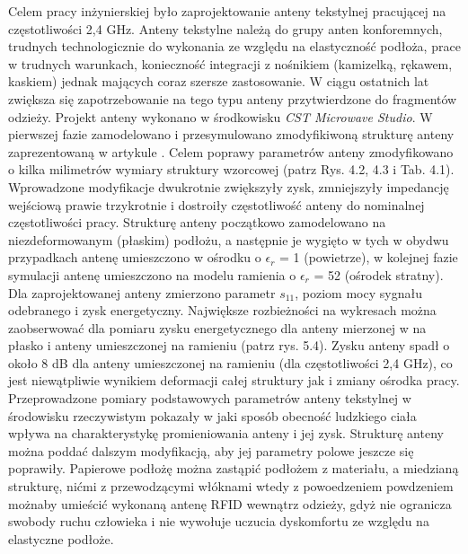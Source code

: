 Celem pracy inżynierskiej było zaprojektowanie anteny tekstylnej pracującej na częstotliwości 2,4 GHz. Anteny tekstylne należą do grupy anten konforemnych, trudnych technologicznie do wykonania ze względu na elastyczność podłoża, prace w trudnych warunkach, konieczność integracji z nośnikiem (kamizelką, rękawem, kaskiem) jednak mających coraz szersze zastosowanie. W ciągu ostatnich lat zwiększa się zapotrzebowanie na tego typu anteny przytwierdzone do fragmentów odzieży.
Projekt anteny wykonano w środkowisku \emph{CST Microwave Studio}. W pierwszej fazie zamodelowano i przesymulowano zmodyfikiwoną strukturę anteny zaprezentowaną w artykule \cite{Artykul_1}. Celem poprawy parametrów anteny zmodyfikowano o kilka milimetrów wymiary struktury wzorcowej (patrz Rys. 4.2, 4.3 i Tab. 4.1). Wprowadzone modyfikacje dwukrotnie zwiększyły zysk, zmniejszyły impedancję wejściową prawie trzykrotnie i dostroiły częstotliwość anteny do nominalnej częstotliwości pracy.
Strukturę anteny początkowo zamodelowano na niezdeformowanym (płaskim) podłożu, a następnie je wygięto w tych w obydwu przypadkach antenę umieszczono w ośrodku o $\epsilon_{r}$ = 1 (powietrze), w kolejnej fazie symulacji antenę umieszczono na modelu ramienia o $\epsilon_{r}$ = 52 (ośrodek stratny).    
Dla zaprojektowanej anteny zmierzono parametr $s_{11}$, poziom mocy sygnału odebranego i zysk energetyczny. Największe rozbieżności na wykresach można zaobserwować dla pomiaru zysku energetycznego dla anteny mierzonej w na płasko i anteny umieszczonej na ramieniu (patrz rys. 5.4). Zysku anteny spadł o około 8 dB dla anteny umieszczonej na ramieniu (dla częstotliwości 2,4 GHz), co jest niewątpliwie wynikiem deformacji całej struktury jak i zmiany ośrodka pracy. 
Przeprowadzone pomiary podstawowych parametrów anteny tekstylnej w środowisku rzeczywistym pokazały w jaki sposób obecność ludzkiego ciała wpływa na charakterystykę promieniowania anteny i jej zysk.
Strukturę anteny można poddać dalszym modyfikacją, aby jej parametry polowe jeszcze się poprawiły. Papierowe podłożę można zastąpić podłożem z materiału, a miedzianą strukturę, nićmi z przewodzącymi włóknami wtedy z powoedzeniem powdzeniem możnaby umieścić wykonaną antenę RFID wewnątrz odzieży, gdyż nie ogranicza swobody ruchu człowieka i nie wywołuje uczucia dyskomfortu ze względu na elastyczne podłoże.
